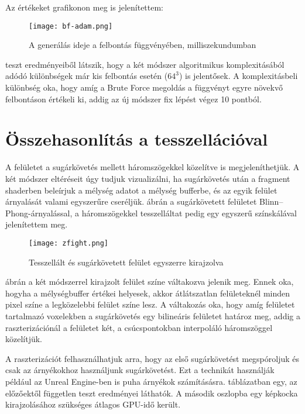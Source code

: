 Az értékeket  grafikonon meg is jelenítettem:

\begin{figure}[H]
	\centering
	\texttt{[image: bf-adam.png]}
	\caption{A generálás ideje a felbontás függvényében, milliszekundumban}
	\label{img:bf-adam}
\end{figure}

 teszt eredményeiből látszik, hogy a két módszer algoritmikus komplexitásából adódó különbségek már kis felbontás esetén ($64^3$) is jelentősek. A komplexitásbeli különbség oka, hogy amíg a Brute Force megoldás a függvényt egyre növekvő felbontáson értékeli ki, addig az új módszer fix lépést végez 10 pontból.

\section{Összehasonlítás a tesszellációval}
A felületet a sugárkövetés mellett háromszögekkel közelítve is megjeleníthetjük. A két módszer eltéréseit úgy tudjuk vizualizálni, ha sugárkövetés után a fragment shaderben beleírjuk a mélység adatot a mélység bufferbe, és az egyik felület árnyalását valami egyszerűre cseréljük.  ábrán  a sugárkövetett felületet Blinn--Phong-árnyalással, a háromszögekkel tesszelláltat pedig egy egyszerű színskálával jelenítettem meg.

\begin{figure}[H]
	\centering
	\texttt{[image: zfight.png]}
	\caption{Tesszellált és sugárkövetett felület egyszerre kirajzolva}
	\label{img:zfight}
\end{figure}

 ábrán a két módszerrel kirajzolt felület színe váltakozva jelenik meg. Ennek oka, hogyha a mélységbuffer értékei helyesek, akkor átlátszatlan felületeknél minden pixel színe a legközelebbi felület színe lesz. A váltakozás oka, hogy amíg felületet tartalmazó voxelekben a sugárkövetés egy bilineáris felületet határoz meg, addig a raszterizációnál a felületet két, a csúcspontokban interpoláló háromszöggel közelítjük.

A raszterizációt felhasználhatjuk arra, hogy az első sugárkövetést megspóroljuk és csak az árnyékokhoz használjunk sugárkövetést. Ezt a technikát használják például az Unreal Engine-ben is puha árnyékok számításásra. \cite{RayTracedDistanceFieldShadowing}  táblázatban egy, az előzőektől független teszt eredményei láthatók. A második oszlopba egy képkocka kirajzolásához szükséges átlagos GPU-idő került.

